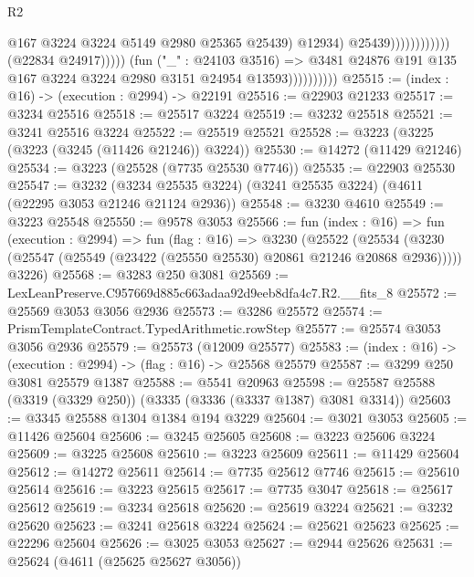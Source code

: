 \begin{lexlean}{R2}
\begin{coremodule}
                                                          @167
                                                          @3224
                                                          @3224
                                                          @5149
                                                          @2980
                                                          @25365
                                                          @25439)
                                                        @12934)
                                                      @25439))))))))))))
                              (@22834 @24917)))))
                      (fun ("_" : @24103 @3516) =>
                      @3481 @24876 @191 @135 @167 @3224 @3224 @2980 @3151 @24954 @13593))))))))))
@25515 := (index : @16) -> (execution : @2994) -> @22191
@25516 := @22903 @21233
@25517 := @3234 @25516
@25518 := @25517 @3224
@25519 := @3232 @25518
@25521 := @3241 @25516 @3224
@25522 := @25519 @25521
@25528 := @3223 (@3225 (@3223 (@3245 (@11426 @21246)) @3224))
@25530 := @14272 (@11429 @21246)
@25534 := @3223 (@25528 (@7735 @25530 @7746))
@25535 := @22903 @25530
@25547 := @3232 (@3234 @25535 @3224) (@3241 @25535 @3224) (@4611 (@22295 @3053 @21246 @21124 @2936))
@25548 := @3230 @4610
@25549 := @3223 @25548
@25550 := @9578 @3053
@25566 := fun (index : @16) =>
  fun (execution : @2994) =>
  fun (flag : @16) =>
  @3230
    (@25522
      (@25534 (@3230 (@25547 (@25549 (@23422 (@25550 @25530) @20861 @21246 @20868 @2936)))))
      @3226)
@25568 := @3283 @250 @3081
@25569 := LexLeanPreserve.C957669d885c663adaa92d9eeb8dfa4c7.R2.__fits_8
@25572 := @25569 @3053 @3056 @2936
@25573 := @3286 @25572
@25574 := PrismTemplateContract.TypedArithmetic.rowStep
@25577 := @25574 @3053 @3056 @2936
@25579 := @25573 (@12009 @25577)
@25583 := (index : @16) -> (execution : @2994) -> (flag : @16) -> @25568 @25579
@25587 := @3299 @250 @3081 @25579 @1387
@25588 := @5541 @20963
@25598 := @25587 @25588 (@3319 (@3329 @250)) (@3335 (@3336 (@3337 @1387) @3081 @3314))
@25603 := @3345 @25588 @1304 @1384 @194 @3229
@25604 := @3021 @3053
@25605 := @11426 @25604
@25606 := @3245 @25605
@25608 := @3223 @25606 @3224
@25609 := @3225 @25608
@25610 := @3223 @25609
@25611 := @11429 @25604
@25612 := @14272 @25611
@25614 := @7735 @25612 @7746
@25615 := @25610 @25614
@25616 := @3223 @25615
@25617 := @7735 @3047
@25618 := @25617 @25612
@25619 := @3234 @25618
@25620 := @25619 @3224
@25621 := @3232 @25620
@25623 := @3241 @25618 @3224
@25624 := @25621 @25623
@25625 := @22296 @25604
@25626 := @3025 @3053
@25627 := @2944 @25626
@25631 := @25624 (@4611 (@25625 @25627 @3056))

\end{coremodule}
\end{lexlean}
